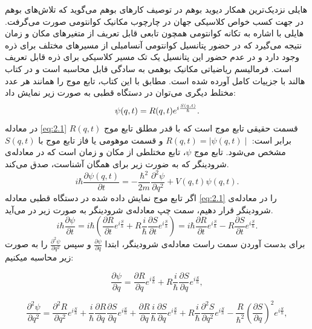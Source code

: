 \documentclass[a4paper,titlepage,12pt,fleqn,oneside]{report}
\begin{document}
هایلی 
نزدیک‌ترین همکار دیوید بوهم در توصیف کارهای بوهم می‌گوید که تلاش‌های بوهم در جهت کسب خواص کلاسیکی جهان در چارچوب مکانیک کوانتومی صورت می‌گرفت. هایلی با اشاره به تکانه کوانتومی همچون تابعی قابل تعریف از متغیرهای مکان و زمان نتیجه می‌گیرد که در حضور پتانسیل کوانتومی آنسامبلی از مسیرهای مختلف برای ذره وجود دارد و در عدم حضور این پتانسیل یک تک مسیر کلاسیکی برای ذره قابل تعریف است.  فرمالیسم ریاضیاتی مکانیک بوهمی به سادگی قابل محاسبه است و در کتاب هالند با جزییات کامل آورده شده است. مطابق با این کتاب، تابع موج را همانند هر عدد مختلط دیگری می‌توان در دستگاه قطبی به صورت زیر نمایش داد:
\begin{equation}
\centering
\psi (q,t)=R(q,t)e^{i\frac{S(q,t)}{\hbar}}.
\label{eq:2.1}
\end{equation}
در معادله
 \ref{eq:2.1} 
$R(q,t)$
قسمت حقیقی تابع موج است که با قدر مطلق تابع موج برابر است: 
$R(q,t)=\mid\psi(q,t)\mid$
و قسمت موهومی یا فاز تابع موج با 
$S(q,t)$
مشخص می‌شود.
 تابع موج $\psi$، تابع مختلطی از مکان و زمان است که در معادله‌ی شرودینگر که به ضورت زیر برای همگان آشناست، صدق می‌کند. 
\begin{equation}
i \hbar \frac{\partial\psi(q,t)}{\partial t} =-\frac{\hbar^2}{2m}\frac{\partial^2\psi}{\partial q^2}+V(q,t)\psi(q,t) .
\label{eq:2.2}
\end{equation}
اگر تابع موج نمایش داده شده در دستگاه قطبی معادله
‌\ref{eq:2.1}
را در معادله‌ی شرودینگر قرار ‌دهیم، سمت چپ معادله‌ی شرودینگر به صورت زیر در می‌آيد. 
\begin{equation}
	i\hbar \frac{\partial \psi}{\partial t}=i\hbar\left(\frac{\partial R}{\partial t} e^{i\frac{S}{h}} +R\frac{i}{\hbar}\frac{\partial S}{\partial t} e^{i\frac{S}{h}} \right)
	=i\hbar\frac{\partial R}{\partial t}e^{i \frac{S}{\hbar}}-R\frac{\partial S}{\partial t}e^{i \frac{S}{\hbar}}.
\end{equation}
برای بدست آوردن سمت راست معادله‌ی شرودینگر، ابتدا $\frac{\partial\psi}{\partial q}$ و سپس  $\frac{\partial^2\psi}{\partial q^2}$ را به صورت  زیر محاسبه میکنیم:

\begin{equation}
\frac{\partial \psi}{\partial q}=\frac{\partial R}{\partial q} e^{i\frac{S}{h}} +R\frac{i}{\hbar}\frac{\partial S}{\partial q} e^{i\frac{S}{h}} ,
\end{equation}

\begin{equation}
\frac{\partial^2 \psi}{\partial q^2}=\frac{\partial^2 R}{\partial q^2} e^{i\frac{S}{h}}+
\frac{i}{\hbar}\frac{\partial R}{\partial q}\frac{\partial S}{\partial q} e^{i\frac{S}{h}}+
\frac{\partial R}{\partial q}\frac{i}{\hbar}\frac{\partial S}{\partial q} e^{i\frac{S}{h}}+
R\frac{i}{\hbar}\frac{\partial^2 S}{\partial q^2} e^{i\frac{S}{h}}-\frac{R}{\hbar^2}\left(\frac{\partial S}{\partial q}\right)^2 e^{i\frac{S}{h}},
\end{equation}
\end{document}
